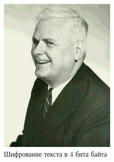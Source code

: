 \documentclass[10pt,a4paper,final]{article} %
\begin{document}
\begin{figure}[h!]
\begin{minipage}{0.3\textwidth}
		\includegraphics[width=\linewidth]{img/Haskell_4}
		\caption{Шифрование текста в 4 бита байта}
	\end{minipage}
	\hspace{0.02\textwidth}
	\begin{minipage}{0.3\textwidth}
		\centering

\end{minipage}
\end{figure}
\end{document}
